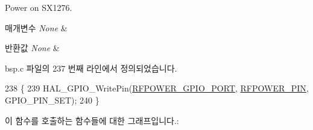 Power on S\+X1276. 


\begin{DoxyParams}{매개변수}
{\em None} & \\
\hline
\end{DoxyParams}

\begin{DoxyRetVals}{반환값}
{\em None} & \\
\hline
\end{DoxyRetVals}


bsp.\+c 파일의 237 번째 라인에서 정의되었습니다.


\begin{DoxyCode}
238 \{
239   HAL\_GPIO\_WritePin(\mbox{\hyperlink{_lory_s_d_k__hw__conf_8h_a8f8e11c368ec33b36ed1ba4d84bdc555}{RFPOWER\_GPIO\_PORT}}, \mbox{\hyperlink{_lory_s_d_k__hw__conf_8h_a15fab54516f17b1b5a79b1fbfc397d79}{RFPOWER\_PIN}}, GPIO\_PIN\_SET); 
240 \}
\end{DoxyCode}
이 함수를 호출하는 함수들에 대한 그래프입니다.\+:
